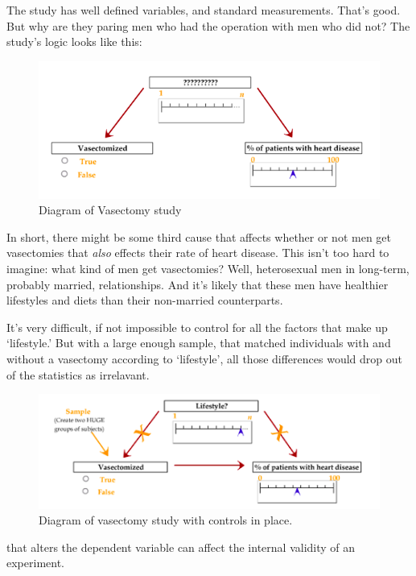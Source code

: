 \begin{refsection}
The study has well defined variables, and standard measurements. That's good. But why are they paring men who had the operation with men who did not? The study's logic looks like this:
\begin{figure}\includegraphics{../images/hypothesis4.png}\caption{Diagram of Vasectomy study}\label{fig:hypothesis4}\end{figure}

In short, there might be some third cause that affects whether or not men get vasectomies that \emph{also} effects their rate of heart disease. This isn't too hard to imagine: what kind of men get vasectomies? Well, heterosexual men in long-term, probably married, relationships. And it's likely that these men have healthier lifestyles and diets than their non-married counterparts. 

It's very difficult, if not impossible to control for all the factors that make up `lifestyle.' But with a large enough sample, that matched individuals with and without a vasectomy according to `lifestyle', all those differences would drop out of the statistics as irrelavant.

\begin{figure}\includegraphics{../images/hypothesis5.png}\caption{Diagram of vasectomy study with controls in place.}\label{fig: hypothesis5}\end{figure}

 that alters the dependent variable can affect the internal validity of an experiment. 


\end{refsection}
